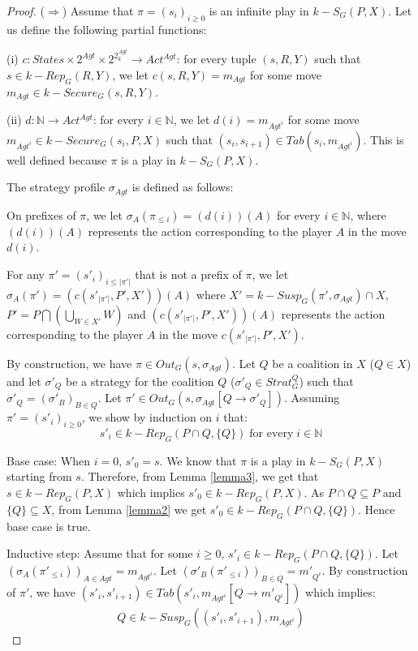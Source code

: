 \begin{proof}
($\Rightarrow$) Assume that $\pi = (s_{i})_{i\geq 0}$ is an infinite play in $k-S_{G}(P, X)$. Let us define the following partial functions:

(i) $c: States \times 2^{Agt} \times 2^{2^{Agt}_{k}} \rightarrow Act^{Agt}$: for every tuple $(s, R, Y)$ such that $s \in k-Rep_{G}(R, Y)$, we let $c(s, R, Y) = m_{Agt}$ for some move $m_{Agt} \in k-Secure_{G}(s, R, Y)$.

(ii) $d: \mathbb{N} \rightarrow Act^{Agt}$: for every $i \in \mathbb{N}$, we let $d(i) = m_{Agt^{i}}$ for some move $m_{Agt^{i}} \in k-Secure_{G}(s_{i}, P, X)$ such that $(s_{i}, s_{i+1}) \in Tab(s_{i}, m_{Agt^{i}})$. This is well defined because $\pi$ is a play in $k-S_{G}(P, X)$.

The strategy profile $\sigma_{Agt}$ is defined as follows:

On prefixes of $\pi$, we let $\sigma_{A}(\pi_{\leq i}) = (d(i))(A)$ for every $i \in \mathbb{N}$, where $(d(i))(A)$ represents the action corresponding to the player $A$ in the move $d(i)$.

For any $\pi' = (s'_{i})_{i\leq \vert \pi' \vert}$ that is not a prefix of $\pi$, we let $\sigma_{A}(\pi') = (c(s'_{\vert \pi' \vert}, P', X'))(A)$ where $X' = k-Susp_{G}(\pi', \sigma_{Agt}) \cap X$, $P' = P \bigcap \left( \bigcup \limits_{W \in X'}W \right)$ and $(c(s'_{\vert \pi' \vert}, P', X'))(A)$ represents the action corresponding to the player $A$ in the move $c(s'_{\vert \pi' \vert}, P', X')$.

By construction, we have $\pi \in Out_{G}(s, \sigma_{Agt})$. Let $Q$ be a coalition in $X$ ($Q \in X$) and let $\sigma'_{Q}$ be a strategy for the coalition $Q$ ($\sigma'_{Q} \in Strat^{Q}_{G}$) such that $\sigma'_{Q} = (\sigma'_{B})_{B\in Q}$. Let $\pi' \in Out_{G}(s, \sigma_{Agt}[Q \rightarrow \sigma'_{Q}])$. Assuming $\pi' = (s'_{i})_{i\geq 0}$, we show by induction on $i$ that:
\[s'_{i} \in k-Rep_{G}(P \cap Q, \lbrace Q \rbrace) \; \text{for every} \; i \in \mathbb{N}\]

Base case: When $i = 0$, $s'_{0} = s$. We know that $\pi$ is a play in $k-S_{G}(P, X)$ starting from $s$. Therefore, from Lemma \ref{lemma3}, we get that $s \in k-Rep_{G}(P, X)$ which implies $s'_{0} \in k-Rep_{G}(P, X)$. As $P \cap Q \subseteq P$ and $\lbrace Q \rbrace \subseteq X$, from Lemma \ref{lemma2} we get $s'_{0} \in k-Rep_{G}(P \cap Q, \lbrace Q \rbrace)$. Hence base case is true.

Inductive step: Assume that for some $i \geq 0$, $s'_{i} \in k-Rep_{G}(P \cap Q, \lbrace Q \rbrace)$. Let $(\sigma_{A}(\pi'_{\leq i}))_{A\in Agt} = m_{Agt^{i}}$. Let $(\sigma'_{B}(\pi'_{\leq i}))_{B\in Q} = m'_{Q^{i}}$. By construction of $\pi'$, we have $(s'_{i}, s'_{i+1}) \in Tab(s'_{i}, m_{Agt^{i}}[Q \rightarrow m'_{Q^{i}}])$ which implies:
\begin{align*}
Q \in k-Susp_{G}((s'_{i}, s'_{i+1}), m_{Agt^{i}})
\end{align*}


\end{proof}
